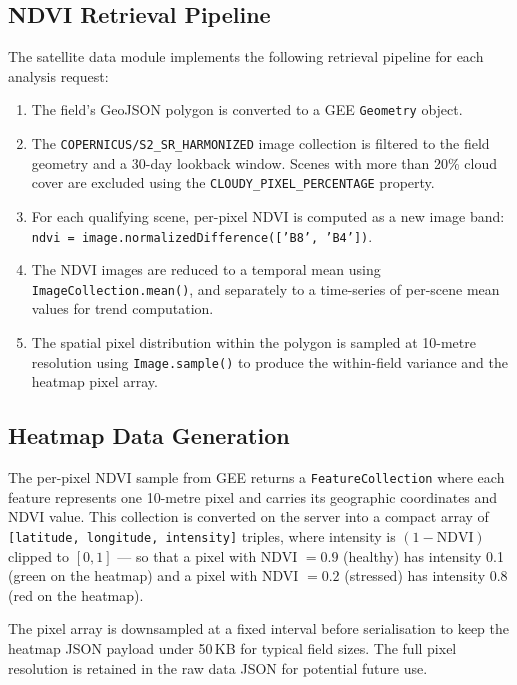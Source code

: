 \subsection{NDVI Retrieval Pipeline}

The satellite data module implements the following retrieval pipeline for each analysis request:

\begin{enumerate}
  \item The field's GeoJSON polygon is converted to a GEE \texttt{Geometry} object.
  \item The \texttt{COPERNICUS/S2\_SR\_HARMONIZED} image collection is filtered to the field geometry and a 30-day lookback window. Scenes with more than 20\% cloud cover are excluded using the \texttt{CLOUDY\_PIXEL\_PERCENTAGE} property.
  \item For each qualifying scene, per-pixel NDVI is computed as a new image band: \texttt{ndvi = image.normalizedDifference(['B8', 'B4'])}.
  \item The NDVI images are reduced to a temporal mean using \texttt{ImageCollection.mean()}, and separately to a time-series of per-scene mean values for trend computation.
  \item The spatial pixel distribution within the polygon is sampled at 10-metre resolution using \texttt{Image.sample()} to produce the within-field variance and the heatmap pixel array.
\end{enumerate}

\subsection{Heatmap Data Generation}

The per-pixel NDVI sample from GEE returns a \texttt{FeatureCollection} where each feature represents one 10-metre pixel and carries its geographic coordinates and NDVI value. This collection is converted on the server into a compact array of \texttt{[latitude, longitude, intensity]} triples, where intensity is $(1 - \text{NDVI})$ clipped to $[0, 1]$ — so that a pixel with NDVI $= 0.9$ (healthy) has intensity 0.1 (green on the heatmap) and a pixel with NDVI $= 0.2$ (stressed) has intensity 0.8 (red on the heatmap).

The pixel array is downsampled at a fixed interval before serialisation to keep the heatmap JSON payload under 50\,KB for typical field sizes. The full pixel resolution is retained in the raw data JSON for potential future use.

